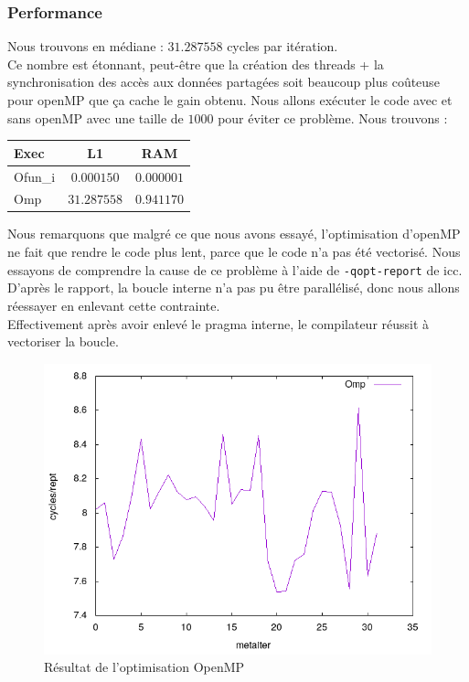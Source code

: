 \documentclass{report}
\begin{document}
  \subsubsection{Performance}
  Nous trouvons en médiane : $31.287558$ cycles par itération.\\
  Ce nombre est étonnant, peut-être que la création des threads + la synchronisation
  des accès aux données partagées soit beaucoup plus coûteuse pour openMP que ça cache le gain obtenu.
  Nous allons exécuter le code avec et sans openMP avec une taille de $1000$ pour éviter ce problème.
  Nous trouvons :
  \begin{center}
    \begin{tabular}{ | l | c | c | }
      \hline
      Exec    & L1          & RAM         \\ \hline
      Ofun\_i & $0.000150$  & $0.000001$  \\ \hline
      Omp     & $31.287558$ & $0.941170$  \\ \hline
    \end{tabular}
  \end{center}
  Nous remarquons que malgré ce que nous avons essayé, l'optimisation d'openMP ne fait que rendre
  le code plus lent, parce que le code n'a pas été vectorisé.
  Nous essayons de comprendre la cause de ce problème à l'aide de \texttt{-qopt-report} de icc.
  D'après le rapport, la boucle interne n'a pas pu être parallélisé, donc nous allons réessayer
  en enlevant cette contrainte.\\
  Effectivement après avoir enlevé le pragma interne, le compilateur réussit à vectoriser la boucle.
  \begin{figure}[ht!]
    \centering
    \includegraphics[scale=0.45]{../metarep/Omp.png}
    \caption{Résultat de l'optimisation OpenMP}
  \end{figure}
\end{document}
